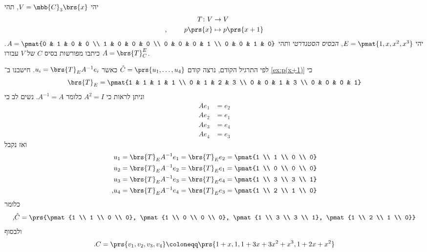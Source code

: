 \documentclass[a4paper,10pt,twoside,openany]{book}
\begin{document}
\begin{exercise}
יהי
$V = \mbb{C}_3\brs{x}$,
תהי
\begin{align*}
T \colon V &\to V \\
\text{,} \hphantom{lalala} p\prs{x} &\mapsto p\prs{x+1}
\end{align*}
יהי
$E = \pmat{1,x,x^2,x^3}$,
\emph{הבסיס הסטנדרטי}
ותהי
$A = \pmat{0 & 1 & 0 & 0 \\ 1 & 0 & 0 & 0 \\ 0 & 0 & 0 & 1 \\ 0 & 0 & 1 & 0}$.
כיתבו מפורשות בסיס
$C$
של
$V$
עבורו
$A = \brs{T}^E_C$.
\end{exercise}

\begin{solution}
לפי התרגיל הקודם, נרצה קודם
$\hat{C} = \prs{u_1, \ldots, u_4}$
כאשר
$u_i = \brs{T}_E A^{-1} e_i$.
חישבנו ב־%
\ref{ex:p(x+1)}
כי
\[\brs{T}_E = \pmat{1 & 1 & 1 & 1 \\ 0 & 1 & 2 & 3 \\ 0 & 0 & 1 & 3 \\ 0 & 0 & 0 & 1}\]
וניתן לראות כי
$A^2 = I$
כלומר
$A^{-1} = A$.
נשים לב כי
\begin{align*}
A e_1 &= e_2 \\
A e_2 &= e_1 \\
A e_3 &= e_4 \\
A e_4 &= e_3
\end{align*}
ואז נקבל
\begin{align*}
u_1 &= \brs{T}_E A^{-1} e_1 = \brs{T}_E e_2 = \pmat{1 \\ 1 \\ 0 \\ 0} \\
u_2 &= \brs{T}_E A^{-1} e_2 = \brs{T}_E e_1 = \pmat{1 \\ 0 \\ 0 \\ 0} \\
u_3 &= \brs{T}_E A^{-1} e_3 = \brs{T}_E e_4 = \pmat{1 \\ 3 \\ 3 \\ 1} \\
\text{,} u_4 &= \brs{T}_E A^{-1} e_4 = \brs{T}_E e_3 = \pmat{1 \\ 2 \\ 1 \\ 0}
\end{align*}
כלומר
\[\text{,} \hat{C} = \prs{\pmat{1 \\ 1 \\ 0 \\ 0}, \pmat{1 \\ 0 \\ 0 \\ 0}, \pmat{1 \\ 3 \\ 3 \\ 1}, \pmat{1 \\ 2 \\ 1 \\ 0}}\]
ולבסוף
\[\text{.} C = \prs{v_1, v_2, v_3, v_4} \coloneqq \prs{1+x, 1, 1+3x+3x^2+x^3, 1+2x+x^2}\]


\end{solution}
\end{document}

